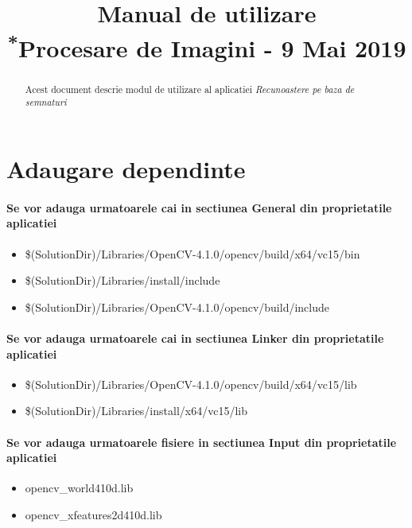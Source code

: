 \documentclass[conference]{IEEEtran}
\begin{document}
\title{Manual de utilizare\\
{\footnotesize \textsuperscript{*}Procesare de Imagini - 9 Mai 2019}
}

\author{
}

\maketitle

\begin{abstract}
Acest document descrie modul de utilizare al aplicatiei \textit{Recunoastere pe baza de semnaturi}
\end{abstract}

\section{Adaugare dependinte}
\paragraph{Se vor adauga urmatoarele cai in sectiunea \textbf{General} din proprietatile aplicatiei}
\begin{itemize}
	\item \$(SolutionDir)/Libraries/OpenCV-4.1.0/opencv/build/x64/vc15/bin
	\item \$(SolutionDir)/Libraries/install/include
	\item \$(SolutionDir)/Libraries/OpenCV-4.1.0/opencv/build/include
\end{itemize}

\paragraph{Se vor adauga urmatoarele cai in sectiunea \textbf{Linker} din proprietatile aplicatiei}
\begin{itemize}
	\item \$(SolutionDir)/Libraries/OpenCV-4.1.0/opencv/build/x64/vc15/lib
	\item \$(SolutionDir)/Libraries/install/x64/vc15/lib
\end{itemize}

\paragraph{Se vor adauga urmatoarele fisiere in sectiunea \textbf{Input} din proprietatile aplicatiei}
\begin{itemize}
	\item opencv\_world410d.lib
	\item opencv\_xfeatures2d410d.lib
\end{itemize}
\end{document}
